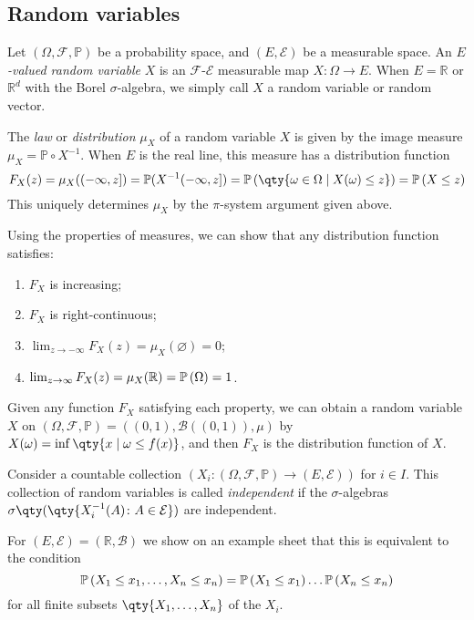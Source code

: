 \subsection{Random variables}
\begin{definition}
	Let $(\Omega, \mathcal F, \mathbb P)$ be a probability space, and $(E, \mathcal E)$ be a measurable space.
	An \emph{$E$-valued random variable} $X$ is an $\mathcal F$-$\mathcal E$ measurable map $X \colon \Omega \to E$.
	When $E = \mathbb R$ or $\mathbb R^d$ with the Borel $\sigma$-algebra, we simply call $X$ a random variable or random vector.

	The \emph{law} or \emph{distribution} $\mu_X$ of a random variable $X$ is given by the image measure $\mu_X = \mathbb P \circ X^{-1}$.
	When $E$ is the real line, this measure has a distribution function
	\[ F_X(z) = \mu_X((-\infty, z]) = \mathbb P(X^{-1}(-\infty,z]) = \prob{\qty{\omega \in \Omega \mid X(\omega) \leq z}} = \prob{X \leq z} \]
	This uniquely determines $\mu_X$ by the $\pi$-system argument given above.
\end{definition}
Using the properties of measures, we can show that any distribution function satisfies:
\begin{enumerate}
	\item $F_X$ is increasing;
	\item $F_X$ is right-continuous;
	\item $\lim_{z \to -\infty} F_X(z) = \mu_X(\varnothing) = 0$;
	\item $\lim_{z \to \infty} F_X(z) = \mu_X(\mathbb R) = \mathbb{P}\left({\Omega}\right) = 1$.
\end{enumerate}
Given any function $F_X$ satisfying each property, we can obtain a random variable $X$ on $(\Omega, \mathcal F, \mathbb P) = ((0,1), \mathcal B((0,1)), \mu)$ by $X(\omega) = \inf\qty{x \mid \omega \leq f(x)}$, and then $F_X$ is the distribution function of $X$.
\begin{definition}
	Consider a countable collection $(X_i \colon (\Omega, \mathcal F, \mathbb P) \to (E, \mathcal E))$ for $i \in I$.
	This collection of random variables is called \emph{independent} if the $\sigma$-algebras $\sigma\qty(\qty{X_i^{-1}(A) \colon A \in \mathcal E})$ are independent.
\end{definition}
For $(E, \mathcal E) = (\mathbb R, \mathcal B)$ we show on an example sheet that this is equivalent to the condition
\[ \mathbb{P}\left({X_1 \leq x_1, \dots, X_n \leq x_n}\right) = \mathbb{P}\left({X_1 \leq x_1}\right) \dots \mathbb{P}\left({X_n \leq x_n}\right) \]
for all finite subsets $\qty{X_1, \dots, X_n}$ of the $X_i$.


